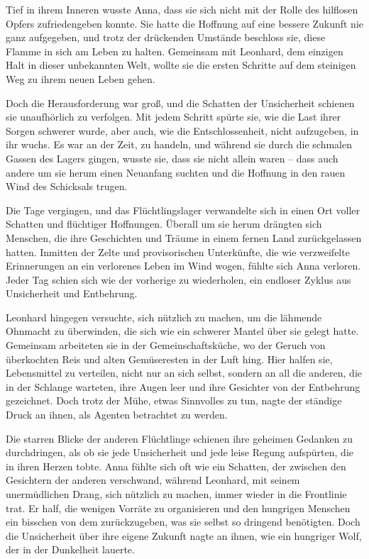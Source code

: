 \documentclass[
]{article}
\begin{document}
Tief in ihrem Inneren wusste Anna, dass sie sich nicht mit der Rolle des
hilflosen Opfers zufriedengeben konnte. Sie hatte die Hoffnung auf eine
bessere Zukunft nie ganz aufgegeben, und trotz der drückenden Umstände
beschloss sie, diese Flamme in sich am Leben zu halten. Gemeinsam mit
Leonhard, dem einzigen Halt in dieser unbekannten Welt, wollte sie die
ersten Schritte auf dem steinigen Weg zu ihrem neuen Leben gehen.

Doch die Herausforderung war groß, und die Schatten der Unsicherheit
schienen sie unaufhörlich zu verfolgen. Mit jedem Schritt spürte sie,
wie die Last ihrer Sorgen schwerer wurde, aber auch, wie die
Entschlossenheit, nicht aufzugeben, in ihr wuchs. Es war an der Zeit, zu
handeln, und während sie durch die schmalen Gassen des Lagers gingen,
wusste sie, dass sie nicht allein waren -- dass auch andere um sie herum
einen Neuanfang suchten und die Hoffnung in den rauen Wind des
Schicksals trugen.

Die Tage vergingen, und das Flüchtlingslager verwandelte sich in einen
Ort voller Schatten und flüchtiger Hoffnungen. Überall um sie herum
drängten sich Menschen, die ihre Geschichten und Träume in einem fernen
Land zurückgelassen hatten. Inmitten der Zelte und provisorischen
Unterkünfte, die wie verzweifelte Erinnerungen an ein verlorenes Leben
im Wind wogen, fühlte sich Anna verloren. Jeder Tag schien sich wie der
vorherige zu wiederholen, ein endloser Zyklus aus Unsicherheit und
Entbehrung.

Leonhard hingegen versuchte, sich nützlich zu machen, um die lähmende
Ohnmacht zu überwinden, die sich wie ein schwerer Mantel über sie gelegt
hatte. Gemeinsam arbeiteten sie in der Gemeinschaftsküche, wo der Geruch
von überkochten Reis und alten Gemüseresten in der Luft hing. Hier
halfen sie, Lebensmittel zu verteilen, nicht nur an sich selbst, sondern
an all die anderen, die in der Schlange warteten, ihre Augen leer und
ihre Gesichter von der Entbehrung gezeichnet. Doch trotz der Mühe, etwas
Sinnvolles zu tun, nagte der ständige Druck an ihnen, als Agenten
betrachtet zu werden.

Die starren Blicke der anderen Flüchtlinge schienen ihre geheimen
Gedanken zu durchdringen, als ob sie jede Unsicherheit und jede leise
Regung aufspürten, die in ihren Herzen tobte. Anna fühlte sich oft wie
ein Schatten, der zwischen den Gesichtern der anderen verschwand,
während Leonhard, mit seinem unermüdlichen Drang, sich nützlich zu
machen, immer wieder in die Frontlinie trat. Er half, die wenigen
Vorräte zu organisieren und den hungrigen Menschen ein bisschen von dem
zurückzugeben, was sie selbst so dringend benötigten. Doch die
Unsicherheit über ihre eigene Zukunft nagte an ihnen, wie ein hungriger
Wolf, der in der Dunkelheit lauerte.
\end{document}
